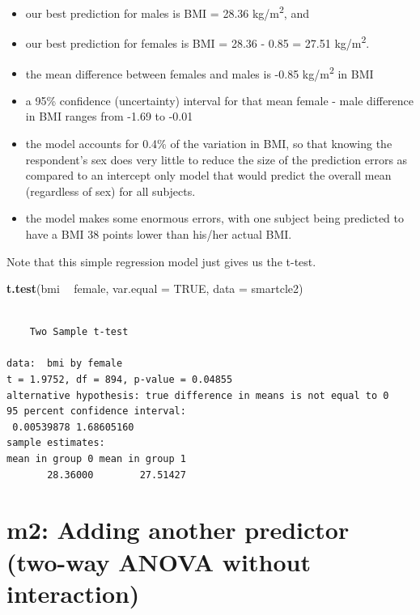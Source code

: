 \documentclass[]{book}
\newenvironment{Shaded}{\begin{snugshade}}{\end{snugshade}}
\newcommand{\KeywordTok}[1]{\textcolor[rgb]{0.13,0.29,0.53}{\textbf{#1}}}
\newcommand{\DataTypeTok}[1]{\textcolor[rgb]{0.13,0.29,0.53}{#1}}
\newcommand{\StringTok}[1]{\textcolor[rgb]{0.31,0.60,0.02}{#1}}
\newcommand{\OtherTok}[1]{\textcolor[rgb]{0.56,0.35,0.01}{#1}}
\newcommand{\OperatorTok}[1]{\textcolor[rgb]{0.81,0.36,0.00}{\textbf{#1}}}
\newcommand{\NormalTok}[1]{#1}
\providecommand{\tightlist}{%
  \setlength{\itemsep}{0pt}\setlength{\parskip}{0pt}}
\theoremstyle{definition}
\theoremstyle{definition}
\theoremstyle{definition}
\theoremstyle{remark}
\begin{document}
\begin{itemize}
\tightlist
\item
  our best prediction for males is BMI = 28.36 kg/m\textsuperscript{2},
  and
\item
  our best prediction for females is BMI = 28.36 - 0.85 = 27.51
  kg/m\textsuperscript{2}.
\item
  the mean difference between females and males is -0.85
  kg/m\textsuperscript{2} in BMI
\item
  a 95\% confidence (uncertainty) interval for that mean female - male
  difference in BMI ranges from -1.69 to -0.01
\item
  the model accounts for 0.4\% of the variation in BMI, so that knowing
  the respondent's sex does very little to reduce the size of the
  prediction errors as compared to an intercept only model that would
  predict the overall mean (regardless of sex) for all subjects.
\item
  the model makes some enormous errors, with one subject being predicted
  to have a BMI 38 points lower than his/her actual BMI.
\end{itemize}

Note that this simple regression model just gives us the t-test.

\begin{Shaded}
\begin{Highlighting}[]
\KeywordTok{t.test}\NormalTok{(bmi }\OperatorTok{~}\StringTok{ }\NormalTok{female, }\DataTypeTok{var.equal =} \OtherTok{TRUE}\NormalTok{, }\DataTypeTok{data =}\NormalTok{ smartcle2)}
\end{Highlighting}
\end{Shaded}

\begin{verbatim}

    Two Sample t-test

data:  bmi by female
t = 1.9752, df = 894, p-value = 0.04855
alternative hypothesis: true difference in means is not equal to 0
95 percent confidence interval:
 0.00539878 1.68605160
sample estimates:
mean in group 0 mean in group 1 
       28.36000        27.51427 
\end{verbatim}

\section{m2: Adding another predictor (two-way ANOVA without
interaction)}\label{m2-adding-another-predictor-two-way-anova-without-interaction}
\end{document}
